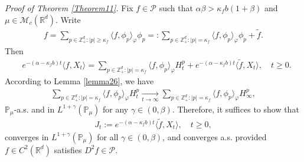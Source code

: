 \documentclass[12pt,a4paper]{amsart}
\theoremstyle{plain}
\theoremstyle{definition}
\numberwithin{equation}{section}
\begin{document}
{\it Proof of Theorem \ref{Theorem11}.}\quad
	Fix  $f \in \mathcal P$ such that $\alpha \beta > \kappa_f b (1+\beta)$ and $\mu \in \mathcal M_c(\mathbb R^d)$.
	Write
\begin{equation}\begin{split}
    f
    =\sum_{p\in \mathbb Z_+^d:|p|\geq \kappa_f}\langle f,\phi_p\rangle_\varphi \phi_p
    =:
    \sum_{p\in \mathbb Z_+^d:|p|= \kappa_f}\langle f,\phi_p\rangle_\varphi \phi_p+\tilde{f}.
\end{split}\end{equation}
	Then
\begin{align*}
    &e^{-(\alpha-\kappa_fb)t}\langle f,X_t\rangle=
    \sum_{p\in \mathbb Z_+^d:|p|= \kappa_f}\langle f,\phi_p\rangle_\varphi H_t^p+e^{-(\alpha-\kappa_fb)t} \langle \tilde{f},X_t\rangle,
    \quad t\geq 0.
\end{align*}
	According to Lemma \ref{lemma26},
	we have
\begin{equation}\begin{split}
\label{as convergence}
     \sum_{p\in \mathbb{Z}_+^d:|p|= \kappa_f}\langle f,\phi_p\rangle_\varphi H_t^p
     \xrightarrow[t\to \infty]{} \sum_{p\in \mathbb{Z}_+^d:|p|=\kappa_f}\langle f, \phi_p\rangle_{\varphi} H_{\infty}^p,
\end{split}\end{equation}
$\mathbb{P}_{\mu}$-a.s. and in $L^{1+\gamma}(\mathbb{P}_{\mu})$ for any $\gamma\in(0,\beta)$.
	Therefore, it suffices to show that
\begin{equation}\begin{split}
    J_t
    :=e^{-(\alpha-\kappa_fb)t}\langle \tilde{f},X_t\rangle,
    \quad t\geq 0,
\end{split}\end{equation}
	converges in $L^{1+\gamma}(\mathbb{P}_{\mu})$ for all $\gamma\in(0,\beta)$, and converges a.s. provided $f\in C^2(\mathbb R^d)$ satisfies $D^2f\in \mathcal{P}$.
\end{document}
